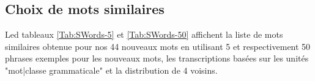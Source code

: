 \documentclass{style/these}
\begin{document}
\begin{part}
\clearpage
\newpage

\chapter{Choix de mots similaires}
\renewcommand{\rightmark}{Choix de mots similaires}
\renewcommand{\leftmark}{Annexe D}

Led tableaux \ref{Tab:SWords-5} et \ref{Tab:SWords-50} affichent la liste de mots similaires obtenue pour nos 44 nouveaux mots en utilisant 5 et respectivement 50 phrases exemples pour les nouveaux mots, les transcriptions basées sur les unités "mot|classe grammaticale" et la distribution de 4 voisins.


\end{part}
\end{document}
